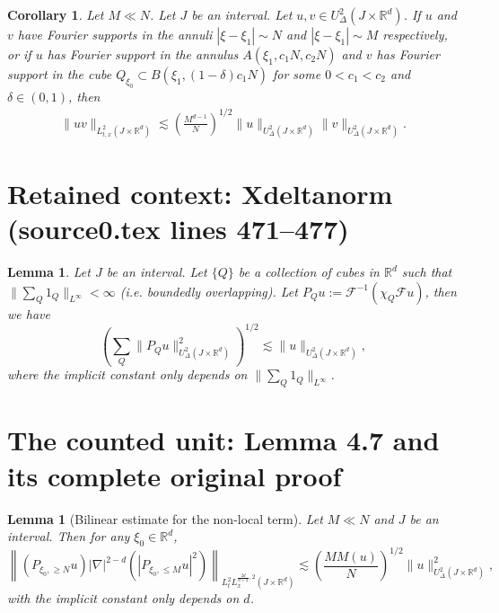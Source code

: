 \documentclass[10pt,a4paper]{amsart}
\def\R{\mathbb{R}}
\theoremstyle{plain}
\newtheorem{lemma}[theorem]{Lemma}
\newtheorem{corollary}[theorem]{Corollary}
\theoremstyle{definition}
\begin{document}
\begin{corollary}\label{bilinear}
Let $M\ll N$. Let $J$ be an interval. Let $u,v\in U_{\Delta}^2(J\times\R^d)$. If $u$ and $v$ have Fourier supports in the annuli $|\xi-\xi_1|\sim N$ and $|\xi-\xi_1|\sim M$ respectively, or if $u$ has Fourier support in the annulus $A(\xi_1,c_{1}N,c_{2}N)$ and $v$ has Fourier support in the cube $Q_{\xi_{0}} \subset B(\xi_1,(1-\delta)c_{1}N)$ for some $0<c_{1}<c_{2}$ and  $\delta \in (0,1)$, then
\begin{align}
\|uv\|_{L_{t,x}^2(J\times\R^d)}\lesssim \left({\frac{M^{d-1}}{N}}\right)^{1/2}  \|u\|_{U_{\Delta}^2(J\times\R^d)}\|v\|_{U_{\Delta}^2(J\times\R^d)}.
\end{align}
\end{corollary}


\section*{Retained context: Xdeltanorm (source0.tex lines 471--477)}

\begin{lemma}\label{Xdeltanorm}
Let $J$ be an interval. Let $\{Q\}$ be a collection of cubes in $\R^{d}$ such that $\|\sum_{Q}1_{Q}\|_{L^{\infty}}<\infty$ (i.e. boundedly overlapping). Let $P_{Q}u:=\mathcal{F}^{-1}(\chi_{Q}\mathcal{F}u)$, then we have
\begin{equation}
\left(\sum_{Q}\|P_{Q}u\|_{U_{\Delta}^{2}(J\times\R^{d})}^{2}\right)^{1/2} \lesssim \|u\|_{U_{\Delta}^{2}(J\times\R^{d})},
\end{equation}
where the implicit constant only depends on $\|\sum_{Q}1_{Q}\|_{L^{\infty}}$.
\end{lemma}


\section{The counted unit: Lemma 4.7 and its complete original proof}

\begin{lemma}[Bilinear estimate for the non-local term]\label{bilinear2}
Let $M\ll N$ and $J$ be an interval. Then for any $\xi_0\in\R^d$,
\[\left\|(P_{\xi_0, \geq N} u)|\nabla|^{2-d}\left(\left|P_{\xi_0, \leq M} u\right|^{2}\right)\right\|_{L_{t}^{2} L_{x}^{\frac{2d}{d+2},2}\left(J \times \mathbb{R}^{d}\right)}\lesssim \left(\frac{MM(u)} {N}\right)^{1/2}\|u\|^2_{U_{\Delta}^2(J\times\R^d)},\]
with the implicit constant only depends on $d$.
\end{lemma}
\end{document}
